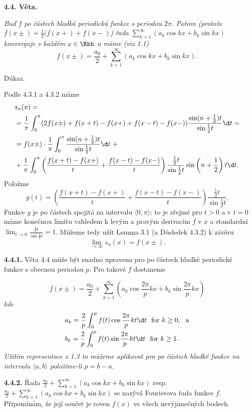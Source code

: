 \documentclass[12pt]{article}
\begin{document}
{\bf 4.4. Věta.} {\em Buď $f$ po částech hladká periodická funkce s periodou $2\pi$. Potom (protože $f(x\pm)=\frac12(f(x+)+f(x-)$) řada
$
\sum_{k=1}^\infty(a_k\cos kx+ b_k\sin kx)
$ konverguje v každém $x\in \Rbb$ a máme (viz 1.1)
$$
f(x\pm)=\frac{a_0}{2}+\sum_{k=1}^\infty(a_k\cos kx+ b_k\sin kx).
$$

 Důkaz.}  Podle  4.3.1 a 4.3.2 máme
$$
\begin{aligned}
&s_n(x)=\\
&=\frac1\pi\int_0^\pi(2f(x\pm)+f(x+t)-f(x+)+ f(x-t)-f(x-))\frac{\sin(n+\frac12)t}{\sin\frac{1}{2}t}\d t=\\
&=f(x\pm)\cdot\frac1\pi\int_0^\pi\frac{\sin(n+\frac12)t}{\sin\frac{1}{2}t}\d t\ +\\
&+\frac1\pi\int_0^\pi\left(\frac{f(x+t)-f(x+)}{t}+ \frac{f(x-t)-f(x-)}{t}\right)\frac{\frac12t}{\sin\frac12t}\sin\left(n+\frac12\right)t\d t.
\end{aligned}
$$
Položme
$$
g(t)=\left(\frac{f(x+t)-f(x+)}{t}+ \frac{f(x-t)-f(x-)}{t}\right)\frac{\frac12t}{\sin\frac12t}.
$$
Funkce $g$ je po částech spojitá na intervalu $\langle 0,\pi\rangle$: to je zřejmé pro $t>0$ a v $t=0$  máme konečnou limitu vzhledem k levým a pravým derivacím  $f$ v $x$ a standardní $\lim_{t\to 0}\frac{\frac12t}{\sin\frac12t}=1$. Můžeme tedy užít Lemma 3.1 (a Důsledek
4.3.2) k závěru
$$
\lim_{\to\infty}s_n(x)=f(x\pm).
$$\sq


\bigskip

{\bf 4.4.1.} Věta 4.4 může být snadno upravena pro po částech hladké periodické funkce s obecnou periodou  $p$. Pro takové $f$ dostaneme

\smallskip

{\em $$
f(x\pm)=\frac{a_0}{2}+\sum_{k=1}^\infty(a_k\cos\frac{2\pi}{p}kx+ b_k\sin\frac{2\pi}{p}kx)
$$
kde
$$
\begin{aligned}
&a_k=\frac2{p}\int_{0}^{p}f(t)\cos\frac{2\pi}{p}kt\d t \ \ \text{for}\ k\geq 0, \ \ \text{a}\\
&b_k=\frac2{p}\int_{0}^{p}f(t)\sin\frac{2\pi}{p}kt\d t \ \ \text{for}\ k\geq 1.
\end{aligned}
$$
Užitím representace z 1.3 to můžeme aplikovat pro po částech hladké funkce na intervalu $\langle a,b\rangle$ položíme-li $p=b-a$.}

\medskip

{\bf 4.4.2.} Řada 
$\frac{a_0}{2}+\sum_{k=1}^\infty(a_k\cos kx+ b_k\sin kx)$ resp.
 $\frac{a_0}{2}+\sum_{k=1}^\infty(a_k\cos kx+ b_k\sin kx)$ se nazývá Fourierova řada funkce $f$. Připomínám, že její součet je roven $f(x)$ ve všech nevýjimečných bodech.
\end{document}
